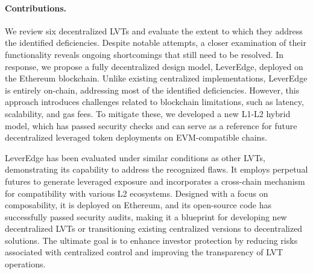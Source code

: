 \paragraph{Contributions.} We review six decentralized LVTs and evaluate the extent to which they address the identified deficiencies. Despite notable attempts, a closer examination of their functionality reveals ongoing shortcomings that still need to be resolved. In response, we propose a fully decentralized design model, LeverEdge, deployed on the Ethereum blockchain. Unlike existing centralized implementations, LeverEdge is entirely on-chain, addressing most of the identified deficiencies. However, this approach introduces challenges related to blockchain limitations, such as latency, scalability, and gas fees. To mitigate these, we developed a new L1-L2 hybrid model, which has passed security checks and can serve as a reference for future decentralized leveraged token deployments on EVM-compatible chains. 

LeverEdge has been evaluated under similar conditions as other LVTs, demonstrating its capability to address the recognized flaws. It employs perpetual futures to generate leveraged exposure and incorporates a cross-chain mechanism for compatibility with various L2 ecosystems. Designed with a focus on composability, it is deployed on Ethereum, and its open-source code has successfully passed security audits, making it a blueprint for developing new decentralized LVTs or transitioning existing centralized versions to decentralized solutions. The ultimate goal is to enhance investor protection by reducing risks associated with centralized control and improving the transparency of LVT operations.

